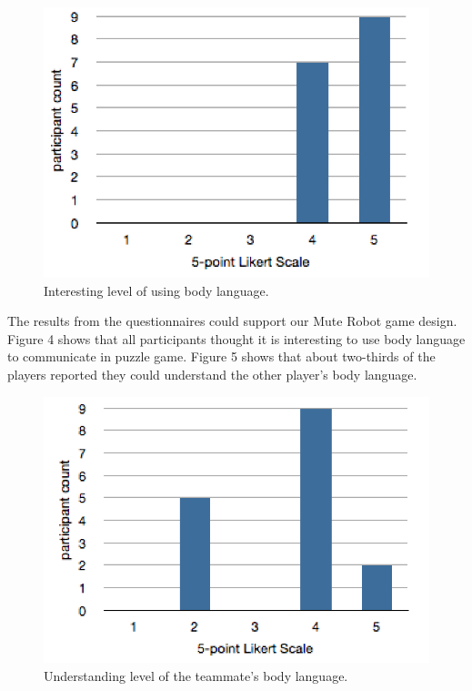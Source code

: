 \documentclass{chi-ext}
\begin{document}
\begin{figure}
  \centering
  \includegraphics[width=0.8\linewidth]{figures/1_BLisInteresting.png}
  \caption{Interesting level of using body language.}
  \label{fig:1_BLisInteresting}
\end{figure}

The results from the questionnaires could support our Mute Robot game design. 
Figure 4 shows that all participants thought it is interesting to use body language to communicate in puzzle game.
Figure 5 shows that about two-thirds of the players reported they could understand the other player's body language.


\begin{figure}
  \centering
  \includegraphics[width=0.9\linewidth]{figures/2_BLunderstand.png}
  \caption{Understanding level of the teammate's body language.}
  \label{fig:2_BLunderstand}
\end{figure}

\end{document}

